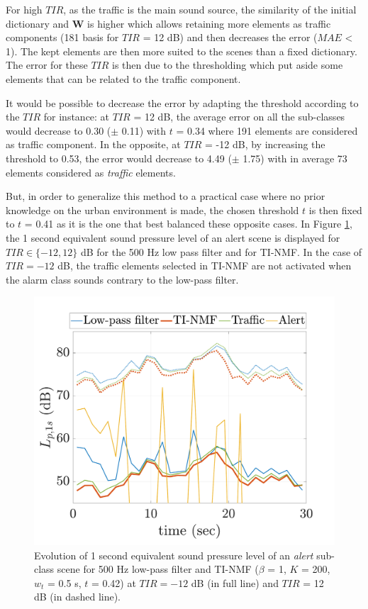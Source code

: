 \documentclass[twocolumn]{svjour3}          %
\begin{document}
For high $TIR$, as the traffic is the main sound source, the similarity of the initial dictionary and $\mathbf{W}$ is higher which allows retaining more elements as traffic components (181 basis for $TIR$ = 12 dB) and then decreases the error ($MAE$ < 1). The kept elements are then more suited to the scenes than a fixed dictionary. The error for these $TIR$ is then due to the thresholding which put aside some elements that can be related to the traffic component. 

It would be possible to decrease the error by adapting the threshold according to the $TIR$ for instance: at $TIR$ = 12 dB, the average error on all the sub-classes would decrease to 0.30 ($\pm$ 0.11) with $t$ = 0.34 where 191 elements are considered as traffic component. In the opposite, at $TIR$ = -12 dB, by increasing the threshold to 0.53, the error would decrease to 4.49 ($\pm$ 1.75) with in average 73 elements considered as \textit{traffic} elements.

But, in order to generalize this method to a practical case where no prior knowledge on the urban environment is made, the chosen threshold $t$ is then fixed to $t$ = 0.41 as it is the one that best balanced these opposite cases.
In Figure \ref{fig:lp_alert}, the 1 second equivalent sound pressure level of an alert scene is displayed for $TIR \in \lbrace -12,12 \rbrace$ dB for the 500 Hz low pass filter and for TI-NMF. In the case of $TIR=-12$ dB, the traffic elements selected in TI-NMF are not activated when the alarm class sounds contrary to the low-pass filter.

\begin{figure}[t]
  \centering
	\includegraphics[width=\textwidth]{figures/NMF_Lp_alert.pdf}
 \caption{Evolution of 1 second equivalent sound pressure level of an \textit{alert} sub-class scene for 500 Hz low-pass filter and TI-NMF ($\beta$ = 1, $K$ = 200, $w_t$ = 0.5 s, $t$ = 0.42) at $TIR = -12$ dB (in full line) and $TIR$ = 12 dB (in dashed line).}
	\label{fig:lp_alert}
\end{figure}
\end{document}
